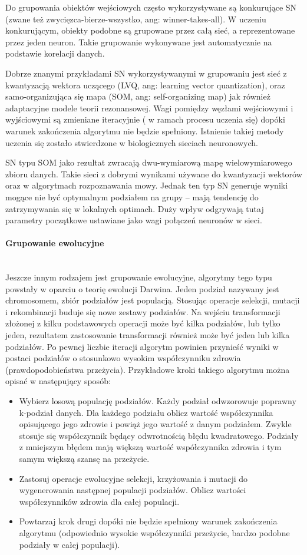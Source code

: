 \documentclass{article}
\newcommand{\myparagraph}[1]{\paragraph{#1}\mbox{}\\}
\begin{document}
Do grupowania obiektów wejściowych często wykorzystywane są konkurujące SN (zwane też zwycięzca-bierze-wszystko, ang: winner-takes-all). W uczeniu konkurującym, obiekty podobne są grupowane przez całą sieć, a reprezentowane przez jeden neuron. Takie grupowanie wykonywane jest automatycznie na podstawie korelacji danych. 

Dobrze znanymi przykładami SN wykorzystywanymi w grupowaniu jest sieć z kwantyzacją wektora uczącego (LVQ, ang: learning vector quantization), oraz samo-organizująca się mapa (SOM, ang: self-organizing map) jak również adaptacyjne modele teorii rezonansowej. Wagi pomiędzy węzłami wejściowymi i wyjściowymi są zmieniane iteracyjnie ( w ramach procesu uczenia się) dopóki warunek zakończenia algorytmu nie będzie spełniony. Istnienie takiej metody uczenia się zostało stwierdzone w biologicznych sieciach neuronowych.

SN typu SOM jako rezultat zwracają dwu-wymiarową mapę wielowymiarowego zbioru danych. Takie sieci z dobrymi wynikami używane do kwantyzacji wektorów oraz w algorytmach rozpoznawania mowy. Jednak ten typ SN generuje wyniki mogące nie być optymalnym podziałem na grupy – mają tendencję do zatrzymywania się w lokalnych optimach. Duży wpływ odgrywają tutaj parametry początkowe ustawiane jako wagi połączeń neuronów w sieci.

\myparagraph{Grupowanie ewolucyjne}

Jeszcze innym rodzajem jest grupowanie ewolucyjne, algorytmy tego typu powstały w oparciu o teorię ewolucji Darwina. Jeden podział nazywany jest chromosomem, zbiór podziałów jest populacją. Stosując operacje selekcji, mutacji i rekombinacji buduje się nowe zestawy podziałów. Na wejściu transformacji złożonej z kilku podstawowych operacji może być kilka podziałów, lub tylko jeden,  rezultatem zastosowanie transformacji również może być jeden lub kilka podziałów. Po pewnej liczbie iteracji algorytm powinien przynieść wyniki w postaci podziałów o stosunkowo wysokim współczynniku zdrowia (prawdopodobieństwa przeżycia). Przykładowe kroki takiego algorytmu można opisać w następujący sposób: 

\begin{itemize}
	\item Wybierz losową populację podziałów. Każdy podział odwzorowuje poprawny k-podział danych. Dla każdego podziału oblicz wartość współczynnika opisującego jego zdrowie i powiąż jego wartość z danym podziałem. Zwykle stosuje się współczynnik będący odwrotnością błędu kwadratowego. Podziały z mniejszym błędem mają większą wartość współczynnika zdrowia i tym samym większą szansę na przeżycie.
	\item Zastosuj operacje ewolucyjne selekcji, krzyżowania i mutacji do wygenerowania następnej populacji podziałów. Oblicz wartości współczynników zdrowia dla całej populacji. 
	\item Powtarzaj krok drugi dopóki nie będzie spełniony warunek zakończenia algorytmu (odpowiednio wysokie współczynniki przeżycie, bardzo podobne podziały w całej populacji).
\end{itemize}
\end{document}
